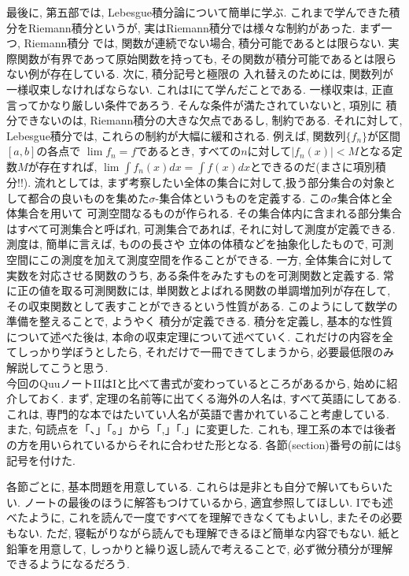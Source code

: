 \documentclass[a4j,dvipdfmx]{jsarticle}
\numberwithin{equation}{section}
\begin{document}
        最後に, 第五部では, Lebesgue積分論について簡単に学ぶ. これまで学んできた積分をRiemann積分というが, 実はRiemann積分では様々な制約があった. まず一つ, Riemann積分
        では, 関数が連続でない場合, 積分可能であるとは限らない. 実際関数が有界であって原始関数を持っても, その関数が積分可能であるとは限らない例が存在している. 次に, 積分記号と極限の
        入れ替えのためには, 関数列が一様収束しなければならない. これはIにて学んだことである. 一様収束は, 正直言ってかなり厳しい条件であろう. そんな条件が満たされていないと, 項別に
        積分できないのは, Riemann積分の大きな欠点であるし, 制約である. それに対して, Lebesgue積分では, これらの制約が大幅に緩和される. 例えば, 関数列$\{f_n\}$が区間$[a,b]$の各点で
        $\lim f_n=f$であるとき, すべての$n$に対して$|f_n(x)|<M$となる定数$M$が存在すれば, $\lim\int f_n(x)dx=\int f(x)dx$とできるのだ(まさに項別積分!!). 
        流れとしては, まず考察したい全体の集合に対して,扱う部分集合の対象として都合の良いものを集めた$\sigma$-集合体というものを定義する. この$\sigma$集合体と全体集合を用いて
        可測空間なるものが作られる. その集合体内に含まれる部分集合はすべて可測集合と呼ばれ, 可測集合であれば, それに対して測度が定義できる. 測度は, 簡単に言えば, ものの長さや
        立体の体積などを抽象化したもので, 可測空間にこの測度を加えて測度空間を作ることができる. 一方, 全体集合に対して実数を対応させる関数のうち, ある条件をみたすものを可測関数と定義する.
        常に正の値を取る可測関数には, 単関数とよばれる関数の単調増加列が存在して, その収束関数として表すことができるという性質がある. このようにして数学の準備を整えることで, ようやく
        積分が定義できる. 積分を定義し, 基本的な性質について述べた後は, 本命の収束定理について述べていく. これだけの内容を全てしっかり学ぼうとしたら, それだけで一冊できてしまうから, 
        必要最低限のみ解説してこうと思う.\\

        今回のQuuノートIIはIと比べて書式が変わっているところがあるから, 始めに紹介しておく. まず, 定理の名前等に出てくる海外の人名は, すべて英語にしてある.
        これは, 専門的な本ではたいてい人名が英語で書かれていること考慮している. また, 句読点を「、」「。」から「,」「.」に変更した. これも, 理工系の本では後者の方を用いられているからそれに合わせた形となる.
        各節(section)番号の前には\S 記号を付けた. 

        各節ごとに, 基本問題を用意している. これらは是非とも自分で解いてもらいたい. ノートの最後のほうに解答もつけているから, 適宜参照してほしい. Iでも述べたように, これを読んで一度ですべてを理解できなくてもよいし, 
        またその必要もない. ただ, 寝転がりながら読んでも理解できるほど簡単な内容でもない. 紙と鉛筆を用意して, しっかりと繰り返し読んで考えることで, 必ず微分積分が理解できるようになるだろう. 
\end{document}

